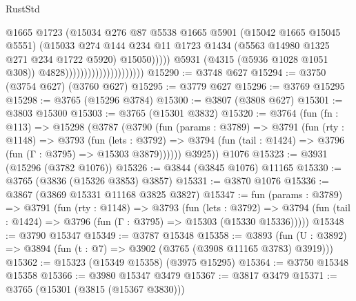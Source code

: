 \begin{lexlean}{RustStd}
\begin{coremodule}
                                                    @1665
                                                    @1723
                                                    (@15034
                                                      @276
                                                      @87
                                                      @5538
                                                      @1665
                                                      @5901
                                                      (@15042 @1665 @15045 @5551)
                                                      (@15033
                                                        @274
                                                        @144
                                                        @234
                                                        @11
                                                        @1723
                                                        @1434
                                                        (@5563 @14980 @1325 @271 @234 @1722 @5920)
                                                        @15050)))))
                                              @5931
                                              (@4315 (@5936 @1028 @1051 @308))
                                              @4828)))))))))))))))))))))
@15290 := @3748 @627
@15294 := @3750 (@3754 @627) (@3760 @627)
@15295 := @3779 @627
@15296 := @3769 @15295
@15298 := @3765 (@15296 @3784)
@15300 := @3807 (@3808 @627)
@15301 := @3803 @15300
@15303 := @3765 (@15301 @3832)
@15320 := @3764
    (fun (fn : @113) =>
    @15298
      (@3787
        (@3790
          (fun (params : @3789) =>
          @3791
            (fun (rty : @1148) =>
            @3793
              (fun (lets : @3792) =>
              @3794 (fun (tail : @1424) => @3796 (fun (Γ : @3795) => @15303 @3879))))))
        @3925))
    @1076
@15323 := @3931 (@15296 (@3782 @1076))
@15326 := @3844 (@3845 @1076) @11165
@15330 := @3765 (@3836 (@15326 @3853) @3857)
@15331 := @3870 @1076
@15336 := @3867 (@3869 @15331 @11168 @3825 @3827)
@15347 := fun (params : @3789) =>
  @3791
    (fun (rty : @1148) =>
    @3793
      (fun (lets : @3792) =>
      @3794 (fun (tail : @1424) => @3796 (fun (Γ : @3795) => @15303 (@15330 @15336)))))
@15348 := @3790 @15347
@15349 := @3787 @15348
@15358 := @3893
    (fun (U : @3892) => @3894 (fun (t : @7) => @3902 (@3765 (@3908 @11165 @3783) @3919)))
@15362 := @15323 (@15349 @15358) (@3975 @15295)
@15364 := @3750 @15348 @15358
@15366 := @3980 @15347 @3479
@15367 := @3817 @3479
@15371 := @3765 (@15301 (@3815 (@15367 @3830)))

\end{coremodule}
\end{lexlean}
